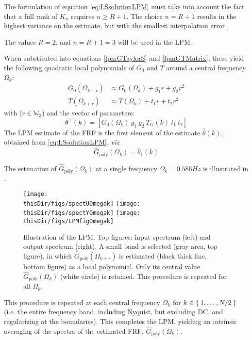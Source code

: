 The formulation of equation \eqref{eq:LSsolutionLPM} must take into account the fact that  a full rank of $K_n$ requires $n \geq R + 1$. The choice $n = R + 1$ results in the highest variance on the estimate, but with the smallest interpolation error \citep{Schoukens2009LPM}.


The values $R = 2$, and $n=R+1=3$ will be used in the \gls{LPM}.

When substituted into equations \eqref{lpmGTaylorS} and \eqref{lpmGTMatrix},  these yield the following quadratic local polynomials of $G_0$ and $T$ around a central frequency $\Omega_{k}$:
\begin{align}
G_0(\Omega_{k+r})
  &\approx 
  G_0(\Omega_k)+g_1r+g_2r^2
  \label{eq:lpm:expansionG:quadratic}
\\
  T(\Omega_{k+r})
    &\approx 
    T(\Omega_k)+t_1r+t_2r^2
    \label{eq:lpm:expansionT:quadratic}
\end{align}
with ($r\in\mathbb{W}_3$) and the vector of parameters:
\begin{equation}\label{lpmThetaEst}
\theta^\top(k)=\left[G_0(\Omega_k) \ g_1 \ g_2\  T_G(k)\  t_1 \ t_2\right]
\end{equation}
The \gls{LPM} estimate of the \gls{FRF} is the first element of the estimate $\hat\theta(k)$, obtained from \eqref{eq:LSsolutionLPM}, \emph{viz}:
\begin{equation}
\hat{G}_\text{poly}(\Omega_k) = \hat\theta_1(k)
\end{equation}


The estimation of $\hat{G}_\text{poly}(\Omega_k)$ at a single frequency $\Omega_k = 0.586\unit{Hz}$ is illustrated in .%
\begin{figure}[htb] %
   \centering
   \texttt{[image: \\thisDir/figs/spectUOmegak]}
   \texttt{[image: \\thisDir/figs/spectYOmegak]}
   \texttt{[image: \\thisDir/figs/LPMfigOmegak]}
   \caption{Illustration of the \gls{LPM}. Top figures: input spectrum (left) and output spectrum (right). A small band is selected (gray area, top figure), in which $\hat G_\mathrm{poly}(\Omega_{k+r})$ is estimated (black thick line, bottom figure) as a local polynomial. Only its central value $\hat G_\mathrm{poly}(\Omega_k)$ (white circle) is retained. This procedure is repeated for all $\Omega_k$.}
   \label{LPM_Schematic_EG}
\end{figure}
This procedure is repeated at each central frequency $\Omega_k$ for  $k\in \Set{1,\dots,N/2}$ (i.e. the entire frequency band, including Nyquist, but excluding \gls{DC}, and regularizing at the boundaries). This completes the \gls{LPM}, yielding an intrinsic averaging of the spectra of the estimated \gls{FRF}, $\hat{G}_\text{poly}(\Omega_k)$.

